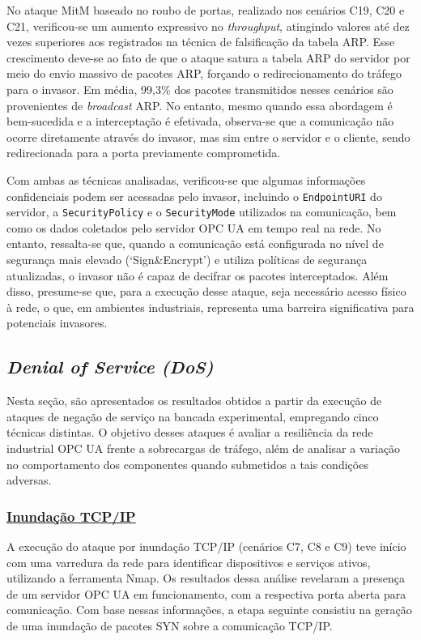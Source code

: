         No ataque MitM baseado no roubo de portas, realizado nos cenários C19, C20 e C21, verificou-se um aumento expressivo no \textit{throughput}, atingindo valores até dez vezes superiores aos registrados na técnica de falsificação da tabela ARP. Esse crescimento deve-se ao fato de que o ataque satura a tabela ARP do servidor por meio do envio massivo de pacotes ARP, forçando o redirecionamento do tráfego para o invasor. Em média, 99,3\% dos pacotes transmitidos nesses cenários são provenientes de \textit{broadcast} ARP. No entanto, mesmo quando essa abordagem é bem-sucedida e a interceptação é efetivada, observa-se que a comunicação não ocorre diretamente através do invasor, mas sim entre o servidor e o cliente, sendo redirecionada para a porta previamente comprometida.

        Com ambas as técnicas analisadas, verificou-se que algumas informações confidenciais podem ser acessadas pelo invasor, incluindo o \texttt{EndpointURI} do servidor, a \texttt{SecurityPolicy} e o \texttt{SecurityMode} utilizados na comunicação, bem como os dados coletados pelo servidor OPC UA em tempo real na rede. No entanto, ressalta-se que, quando a comunicação está configurada no nível de segurança mais elevado (`Sign\&Encrypt') e utiliza políticas de segurança atualizadas, o invasor não é capaz de decifrar os pacotes interceptados. Além disso, presume-se que, para a execução desse ataque, seja necessário acesso físico à rede, o que, em ambientes industriais, representa uma barreira significativa para potenciais invasores.

    \subsection{\textit{Denial of Service (DoS)}}

        Nesta seção, são apresentados os resultados obtidos a partir da execução de ataques de negação de serviço na bancada experimental, empregando cinco técnicas distintas. O objetivo desses ataques é avaliar a resiliência da rede industrial OPC UA frente a sobrecargas de tráfego, além de analisar a variação no comportamento dos componentes quando submetidos a tais condições adversas.

        \subsubsection*{\underline{Inundação TCP/IP}}
    
            A execução do ataque por inundação TCP/IP (cenários C7, C8 e C9) teve início com uma varredura da rede para identificar dispositivos e serviços ativos, utilizando a ferramenta Nmap. Os resultados dessa análise revelaram a presença de um servidor OPC UA em funcionamento, com a respectiva porta aberta para comunicação. Com base nessas informações, a etapa seguinte consistiu na geração de uma inundação de pacotes SYN sobre a comunicação TCP/IP.
            
